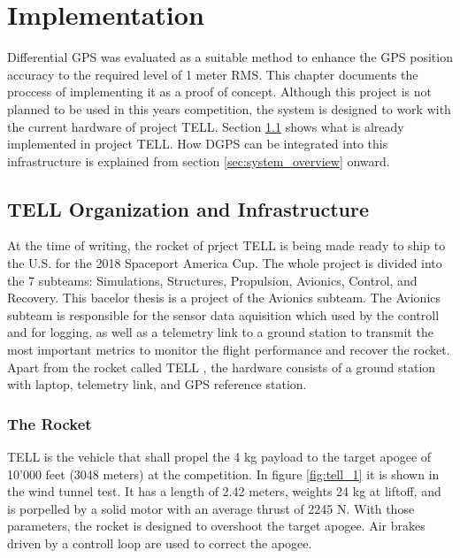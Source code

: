 \chapter{Implementation}

Differential GPS was evaluated as a suitable method to enhance the GPS position accuracy to the required level of 1 meter RMS.
This chapter documents the proccess of implementing it as a proof of concept.
Although this project is not planned to be used in this years competition, the system is designed to work with the current hardware of project TELL.
Section \ref{sec:tell_infrastructure} shows what is already implemented in project TELL.
How DGPS can be integrated into this infrastructure is explained from section \ref{sec:system_overview} onward.


\section{TELL Organization and Infrastructure}\label{sec:tell_infrastructure}

At the time of writing, the rocket of prject TELL is being made ready to ship to the U.S. for the 2018 Spaceport America Cup.
The whole project is divided into the 7 subteams: Simulations, Structures, Propulsion, Avionics, Control, and Recovery.
This bacelor thesis is a project of the Avionics subteam.
The Avionics subteam is responsible for the sensor data aquisition which used by the controll and for logging, as well as a telemetry link to a ground station to transmit the most important metrics to monitor the flight performance and recover the rocket.
Apart from the rocket called TELL , the hardware consists of a ground station with laptop, telemetry link, and GPS reference station.

\subsection{The Rocket}

TELL  is the vehicle that shall propel the 4 kg payload to the target apogee of 10'000 feet (3048 meters) at the competition.
In figure \ref{fig:tell_1} it is shown in the wind tunnel test.
It has a length of 2.42 meters, weights 24 kg at liftoff, and is porpelled by a solid motor with an average thrust of 2245 N.
With those parameters, the rocket is designed to overshoot the target apogee.
Air brakes driven by a controll loop are used to correct the apogee.

